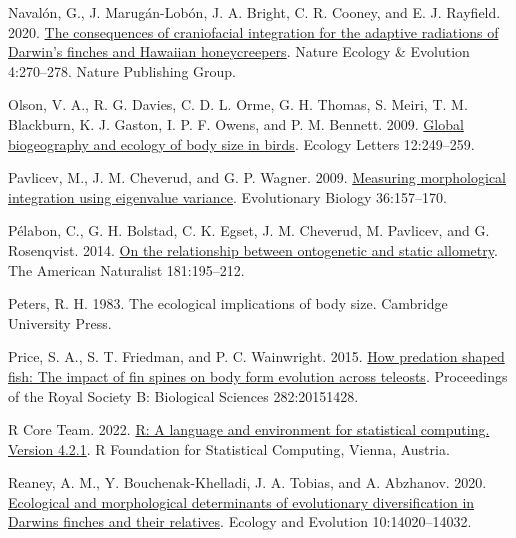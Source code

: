 \documentclass[
  11pt,
]{article}
\newlength{\cslhangindent}
\newlength{\cslentryspacingunit} %
\newenvironment{CSLReferences}[2] %
 {%
  \setlength{\parindent}{0pt}
  \ifodd #1
  \let\oldpar\par
  \def\par{\hangindent=\cslhangindent\oldpar}
  \fi
  \setlength{\parskip}{#2\cslentryspacingunit}
 }%
 {}
\begin{document}
\begin{CSLReferences}{1}{0}
\leavevmode{}%
Navalón, G., J. Marugán-Lobón, J. A. Bright, C. R. Cooney, and E. J.
Rayfield. 2020. \href{https://doi.org/10.1038/s41559-019-1092-y}{The
consequences of craniofacial integration for the adaptive radiations of
{D}arwin's finches and {H}awaiian honeycreepers}. Nature Ecology \&
Evolution 4:270--278. Nature Publishing Group.

\leavevmode{}%
Olson, V. A., R. G. Davies, C. D. L. Orme, G. H. Thomas, S. Meiri, T. M.
Blackburn, K. J. Gaston, I. P. F. Owens, and P. M. Bennett. 2009.
\href{https://doi.org/10.1111/j.1461-0248.2009.01281.x}{Global
biogeography and ecology of body size in birds}. Ecology Letters
12:249--259.

\leavevmode{}%
Pavlicev, M., J. M. Cheverud, and G. P. Wagner. 2009.
\href{https://doi.org/10.1007/s11692-008-9042-7}{Measuring morphological
integration using eigenvalue variance}. Evolutionary Biology
36:157--170.

\leavevmode{}%
Pélabon, C., G. H. Bolstad, C. K. Egset, J. M. Cheverud, M. Pavlicev,
and G. Rosenqvist. 2014. \href{https://doi.org/10.1086/668820}{On the
relationship between ontogenetic and static allometry}. The American
Naturalist 181:195--212.

\leavevmode{}%
Peters, R. H. 1983. The ecological implications of body size. Cambridge
University Press.

\leavevmode{}%
Price, S. A., S. T. Friedman, and P. C. Wainwright. 2015.
\href{https://doi.org/10.1098/rspb.2015.1428}{How predation shaped fish:
The impact of fin spines on body form evolution across teleosts}.
Proceedings of the Royal Society B: Biological Sciences 282:20151428.

\leavevmode{}%
R Core Team. 2022. \href{https://www.R-project.org/}{R: A language and
environment for statistical computing. Version 4.2.1}. R Foundation for
Statistical Computing, Vienna, Austria.

\leavevmode{}%
Reaney, A. M., Y. Bouchenak-Khelladi, J. A. Tobias, and A. Abzhanov.
2020. \href{https://doi.org/10.1002/ece3.6994}{Ecological and
morphological determinants of evolutionary diversification in
{D}arwin{\textquotesingle}s finches and their relatives}. Ecology and
Evolution 10:14020--14032.


\end{CSLReferences}
\end{document}
